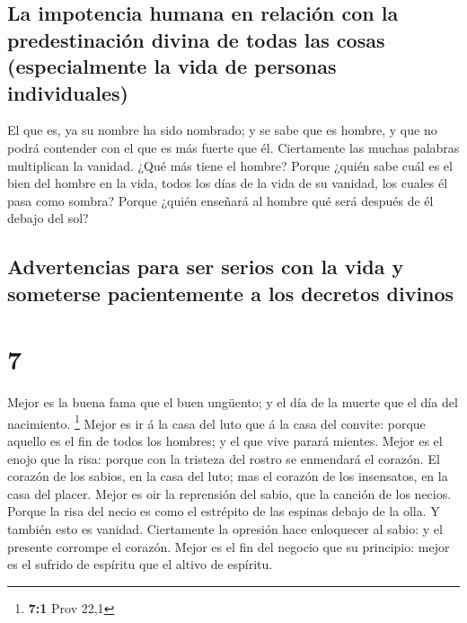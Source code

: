 \hypertarget{la-impotencia-humana-en-relaciuxf3n-con-la-predestinaciuxf3n-divina-de-todas-las-cosas-especialmente-la-vida-de-personas-individuales}{%
\subsection{La impotencia humana en relación con la predestinación
divina de todas las cosas (especialmente la vida de personas
individuales)}\label{la-impotencia-humana-en-relaciuxf3n-con-la-predestinaciuxf3n-divina-de-todas-las-cosas-especialmente-la-vida-de-personas-individuales}}

 El que es, ya su nombre ha sido nombrado; y se sabe que
es hombre, y que no podrá contender con el que es más fuerte que él.
 Ciertamente las muchas palabras multiplican la vanidad.
¿Qué más tiene el hombre?  Porque ¿quién sabe cuál es el
bien del hombre en la vida, todos los días de la vida de su vanidad, los
cuales él pasa como sombra? Porque ¿quién enseñará al hombre qué será
después de él debajo del sol?

\hypertarget{advertencias-para-ser-serios-con-la-vida-y-someterse-pacientemente-a-los-decretos-divinos}{%
\subsection{Advertencias para ser serios con la vida y someterse
pacientemente a los decretos
divinos}\label{advertencias-para-ser-serios-con-la-vida-y-someterse-pacientemente-a-los-decretos-divinos}}

\hypertarget{section-6}{%
\section{7}\label{section-6}}

 Mejor es la buena fama que el buen ungüento; y el día de
la muerte que el día del nacimiento. \footnote{\textbf{7:1} Prov 22,1}
 Mejor es ir á la casa del luto que á la casa del convite:
porque aquello es el fin de todos los hombres; y el que vive parará
mientes.  Mejor es el enojo que la risa: porque con la
tristeza del rostro se enmendará el corazón.  El corazón
de los sabios, en la casa del luto; mas el corazón de los insensatos, en
la casa del placer.  Mejor es oir la reprensión del sabio,
que la canción de los necios.  Porque la risa del necio es
como el estrépito de las espinas debajo de la olla. Y también esto es
vanidad.  Ciertamente la opresión hace enloquecer al
sabio: y el presente corrompe el corazón.  Mejor es el fin
del negocio que su principio: mejor es el sufrido de espíritu que el
altivo de espíritu.

